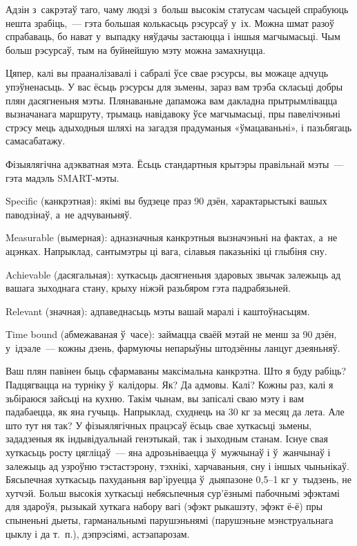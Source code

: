 Адзін з~сакрэтаў таго, чаму людзі з~больш высокім статусам часьцей спрабуюць нешта зрабіць,~--- гэта большая колькасьць рэсурсаў у~іх. Можна шмат разоў спрабаваць, бо нават у~выпадку няўдачы застаюцца і іншыя магчымасьці. Чым больш рэсурсаў, тым на буйнейшую мэту можна замахнуцца.

Цяпер, калі вы прааналізавалі і сабралі ўсе свае рэсурсы, вы можаце адчуць упэўненасьць. У вас ёсьць рэсурсы для зьмены, зараз вам трэба скласьці добры плян дасягненьня мэты. Плянаваньне дапаможа вам дакладна прытрымлівацца вызначанага маршруту, трымаць навідавоку ўсе магчымасьці, пры павелічэньні стрэсу мець адыходныя шляхі на загадзя прадуманыя «ўмацаваньні», і пазьбягаць самасабатажу.

Фізыялягічна адэкватная мэта. Ёсьць стандартныя крытэры правільнай мэты~--- гэта мадэль SMART-мэты. 

Specific (канкрэтная): якімі вы будзеце праз 90 дзён, характарыстыкі вашых паводзінаў, а~не адчуваньняў. 

Measurable (вымерная): адназначныя канкрэтныя вызначэньні на фактах, а~не ацэнках. Напрыклад, сантымэтры ці вага, сілавыя паказьнікі ці глыбіня сну. 

Achievable (дасягальная): хуткасьць дасягненьня здаровых звычак залежыць ад вашага зыходнага стану, крыху ніжэй разьбяром гэта падрабязьней. 

Relevant (значная): адпаведнасьць мэты вашай маралі і каштоўнасьцям. 

Time bound (абмежаваная ў~часе): займацца сваёй мэтай не менш за 90 дзён, у~ідэале~--- кожны дзень, фармуючы непарыўны штодзённы ланцуг дзеяньняў. 

Ваш плян павінен быць сфармаваны максімальна канкрэтна. Што я буду рабіць? Падцягвацца на турніку ў~калідоры. Як? Да адмовы. Калі? Кожны раз, калі я зьбіраюся зайсьці на кухню. Такім чынам, вы запісалі сваю мэту і вам падабаецца, як яна гучыць. Напрыклад, схуднець на 30 кг за месяц да лета. Але што тут ня так? У фізыялягічных працэсаў ёсьць свае хуткасьці зьмены, зададзеныя як індывідуальнай генэтыкай, так і зыходным станам. Існуе свая хуткасьць росту цягліцаў~--- яна адрозьніваецца ў~мужчынаў і ў~жанчынаў і залежыць ад узроўню тэстастэрону, тэхнікі, харчаваньня, сну і іншых чыньнікаў. Бясьпечная хуткасьць пахуданьня вар'іруецца ў~дыяпазоне 0,5--1 кг у~тыдзень, не хутчэй. Больш высокія хуткасьці небясьпечныя сур'ёзнымі пабочнымі эфэктамі для здароўя, рызыкай хуткага набору вагі (эфэкт рыкашэту, эфэкт ё-ё) пры спыненьні дыеты, гарманальнымі парушэньнямі (парушэньне мэнструальнага цыклу і да т.~п.), дэпрэсіямі, астэапарозам. 

